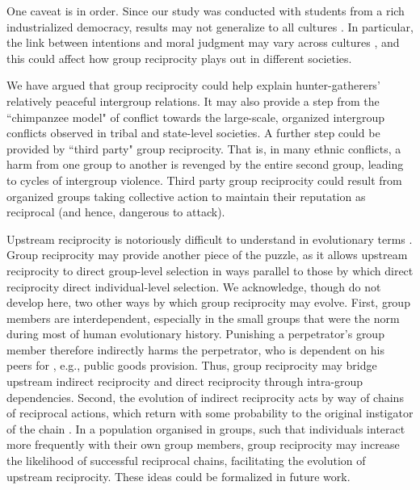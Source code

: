 \documentclass[12pt,a4paper]{article}\usepackage[]{graphicx}\usepackage[]{color}
\begin{document}
One caveat is in order.
Since our study was conducted with students from a rich industrialized democracy, results may not generalize to all cultures \citep{henrich2010most}. In particular, the link between intentions and moral judgment may vary across cultures \citep{barrett2016small}, and this could affect how group reciprocity plays out in different societies.


We have argued that group reciprocity could help explain hunter-gatherers' relatively peaceful intergroup relations. It may
also provide a step from the ``chimpanzee model" of conflict towards the large-scale, organized intergroup conflicts
observed in tribal and state-level societies. A further step could be provided by ``third party" group reciprocity. That 
is, in many ethnic conflicts, a harm from one group to another is revenged by the entire second group, leading to 
cycles of intergroup violence. Third party group reciprocity could result from organized groups taking collective
action to maintain their reputation as reciprocal (and hence, dangerous to attack).

Upstream reciprocity is notoriously difficult to understand in evolutionary
terms \citep{boyd1989evolution,nowak2007upstream}. Group reciprocity
may provide another piece of the puzzle, as it allows upstream reciprocity to direct group-level selection in ways parallel 
to those by which direct reciprocity direct individual-level selection.
We acknowledge, though do not develop here, two other ways by which group reciprocity may evolve.
First, group members are interdependent, especially in the small groups that were the norm during most of human evolutionary 
history. Punishing a perpetrator's group member therefore indirectly harms the perpetrator, who is dependent on his peers for
, e.g., public goods provision. Thus, group reciprocity may bridge upstream indirect reciprocity and direct reciprocity 
through intra-group dependencies. Second, the evolution of indirect reciprocity acts by way of chains
of reciprocal actions, which return with some probability to the original
instigator of the chain \citep{nowak2007upstream}. In a population
organised in groups, such that individuals interact more frequently with
their own group members, group reciprocity may increase the likelihood
of successful reciprocal chains, facilitating the evolution of upstream
reciprocity. These ideas could be formalized in future work.
\end{document}
